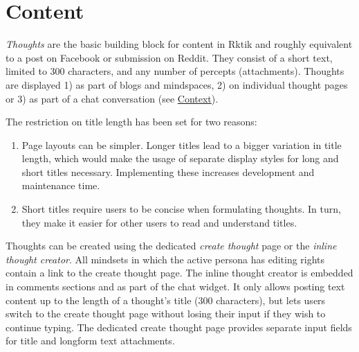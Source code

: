\section{Content}\label{content}


\emph{Thoughts} are the basic building block for content in Rktik and
roughly equivalent to a post on Facebook or submission on Reddit. They
consist of a short text, limited to 300 characters, and any number of
percepts (attachments). Thoughts are displayed 1) as part of blogs and
mindspaces, 2) on individual thought pages or 3) as part of a chat
conversation (see \hyperref[context]{Context}).

The restriction on title length has been set for two reasons:

\begin{enumerate}
\def\labelenumi{\arabic{enumi}.}
\tightlist
\item
  Page layouts can be simpler. Longer titles lead to a bigger variation
  in title length, which would make the usage of separate display styles
  for long and short titles necessary. Implementing these increases
  development and maintenance time.
\item
  Short titles require users to be concise when formulating thoughts. In
  turn, they make it easier for other users to read and understand
  titles.
\end{enumerate}

Thoughts can be created using the dedicated \emph{create thought} page
or the \emph{inline thought creator}. All mindsets in which the active
persona has editing rights contain a link to the create thought page.
The inline thought creator is embedded in comments sections and as part
of the chat widget. It only allows posting text content up to the length
of a thought's title (300 characters), but lets users switch to the
create thought page without losing their input if they wish to continue
typing. The dedicated create thought page provides separate input fields
for title and longform text attachments.


